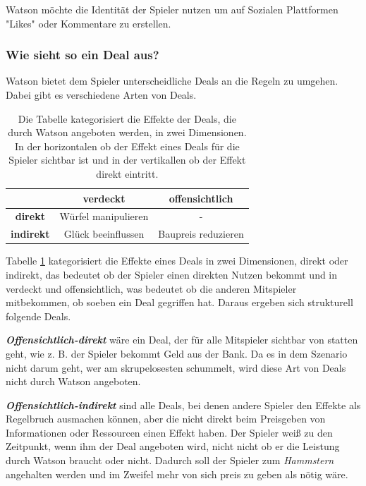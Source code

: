 \documentclass[german]{cgspaper} %
\newcommand{\neuerBegriff}[1]{\textbf{\textit{#1}}}
\begin{document}
Watson möchte die Identität der Spieler nutzen um auf Sozialen Plattformen "Likes" oder Kommentare zu erstellen.

\subsubsection{Wie sieht so ein Deal aus?}

Watson bietet dem Spieler unterscheidliche Deals an die Regeln zu umgehen.
Dabei gibt es verschiedene Arten von Deals.

\begin{table}[h]
\centering
\begin{tabular}{|c|c|c|}
\hline 
& \textbf{verdeckt} & \textbf{offensichtlich} \\
\hline
\textbf{direkt} & Würfel manipulieren & - \\
\hline
\textbf{indirekt} & Glück beeinflussen & Baupreis reduzieren \\
\hline
\end{tabular}
\caption{Die Tabelle kategorisiert die Effekte der Deals, die durch Watson angeboten werden, in zwei Dimensionen. In der horizontalen ob der Effekt eines Deals für die Spieler sichtbar ist und in der vertikallen ob der Effekt direkt eintritt.}
\label{tab:effekte}
\end{table}

Tabelle \ref{tab:effekte} kategorisiert die Effekte eines Deals in zwei Dimensionen, direkt oder indirekt, das bedeutet ob der Spieler einen direkten Nutzen bekommt und in verdeckt und offensichtlich, was bedeutet ob die anderen Mitspieler mitbekommen, ob soeben ein Deal gegriffen hat.
Daraus ergeben sich strukturell folgende Deals.

\neuerBegriff{Offensichtlich-direkt} wäre ein Deal, der für alle Mitspieler sichtbar von statten geht, wie z. B. der Spieler bekommt Geld aus der Bank. 
Da es in dem Szenario nicht darum geht, wer am skrupelosesten schummelt, wird diese Art von Deals nicht durch Watson angeboten.

\neuerBegriff{Offensichtlich-indirekt} sind alle Deals, bei denen andere Spieler den Effekte als Regelbruch ausmachen können, aber die nicht direkt beim Preisgeben von Informationen oder Ressourcen einen Effekt haben.
Der Spieler weiß zu den Zeitpunkt, wenn ihm der Deal angeboten wird, nicht nicht ob er die Leistung durch Watson braucht oder nicht.
Dadurch soll der Spieler zum \textit{Hammstern} angehalten werden und im Zweifel mehr von sich preis zu geben als nötig wäre.
\end{document}
